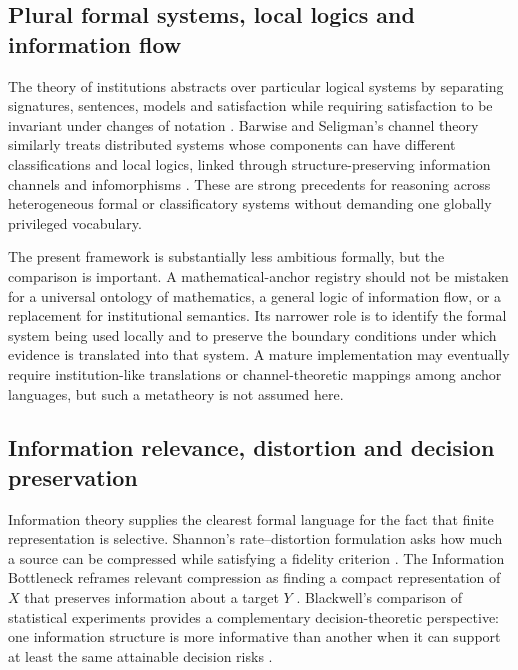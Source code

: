 \documentclass[11pt,a4paper]{article}
\begin{document}
\subsection{Plural formal systems, local logics and information flow}
The theory of institutions abstracts over particular logical systems by separating signatures, sentences, models and satisfaction while requiring satisfaction to be invariant under changes of notation \cite{goguenBurstall1992}. Barwise and Seligman's channel theory similarly treats distributed systems whose components can have different classifications and local logics, linked through structure-preserving information channels and infomorphisms \cite{barwiseSeligman1997}. These are strong precedents for reasoning across heterogeneous formal or classificatory systems without demanding one globally privileged vocabulary.

The present framework is substantially less ambitious formally, but the comparison is important. A mathematical-anchor registry should not be mistaken for a universal ontology of mathematics, a general logic of information flow, or a replacement for institutional semantics. Its narrower role is to identify the formal system being used locally and to preserve the boundary conditions under which evidence is translated into that system. A mature implementation may eventually require institution-like translations or channel-theoretic mappings among anchor languages, but such a metatheory is not assumed here.

\subsection{Information relevance, distortion and decision preservation}
Information theory supplies the clearest formal language for the fact that finite representation is selective. Shannon's rate--distortion formulation asks how much a source can be compressed while satisfying a fidelity criterion \cite{shannon1959}. The Information Bottleneck reframes relevant compression as finding a compact representation of $X$ that preserves information about a target $Y$ \cite{tishby2000}. Blackwell's comparison of statistical experiments provides a complementary decision-theoretic perspective: one information structure is more informative than another when it can support at least the same attainable decision risks \cite{blackwell1953}.
\end{document}
